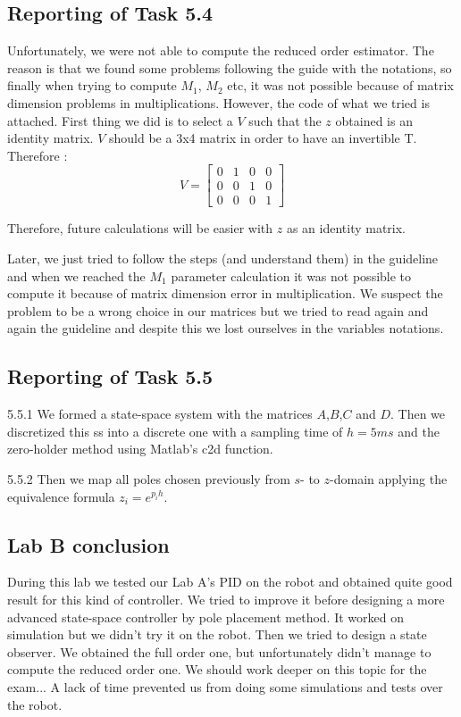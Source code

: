 \documentclass[11pt]{article}
\begin{document}
\subsection*{Reporting of Task 5.4}
Unfortunately, we were not able to compute the reduced order estimator.
The reason is that we found some problems following the guide with the notations, so finally when trying to compute $M_1$, $M_2$ etc, it was not possible because of matrix dimension problems in multiplications.
However, the code of what we tried is attached.
First thing we did is to select a $V$ such that the $z$ obtained is an identity matrix. $V$ should be a 3x4 matrix in order to have an invertible T. Therefore :
\begin{equation*}
V=
\begin{bmatrix}
0 & 1 & 0 & 0 \\
0 & 0 & 1 & 0 \\
0 & 0 & 0 & 1
\end{bmatrix}
\end{equation*}

Therefore, future calculations will be easier with $z$ as an identity matrix.

Later, we just tried to follow the steps (and understand them) in the guideline and when we reached the $M_1$ parameter calculation it was not possible to compute it because of matrix dimension error in multiplication. We suspect the problem to be a wrong choice in our matrices but we tried to read again and again the guideline and despite this we lost ourselves in the variables notations.



\subsection*{Reporting of Task 5.5}
5.5.1 We formed a state-space system with the matrices $A$,$B$,$C$ and $D$. Then we discretized this ss into a discrete one with a sampling time of $h=5 ms$ and the zero-holder method using Matlab's c2d function.

5.5.2 Then we map all poles chosen previously from $s$- to $z$-domain applying the equivalence formula $z_i=e^{p_ih}$.


\subsection*{Lab B conclusion}
During this lab we tested our Lab A's PID on the robot and obtained quite good result for this kind of controller. We tried to improve it before designing a more advanced state-space controller by pole placement method. It worked on simulation but we didn't try it on the robot. Then we tried to design a state observer. We obtained the full order one, but unfortunately didn't manage to compute the reduced order one. We should work deeper on this topic for the exam...
A lack of time prevented us from doing some simulations and tests over the robot.
\end{document}
